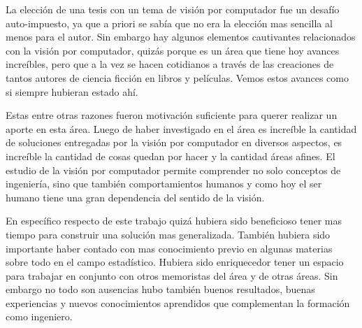 La elección de una tesis con un tema de visión por computador fue un desafío auto-impuesto, ya que a priori se sabía que no era la elección mas sencilla al menos para el autor. Sin embargo hay algunos elementos cautivantes relacionados con la visión por computador, quizás porque es un área que tiene hoy avances increíbles, pero que a la vez se hacen cotidianos a través de las creaciones de tantos autores de ciencia ficción en libros y películas. Vemos estos avances como si siempre hubieran estado ahí. 

Estas entre otras razones fueron motivación suficiente para querer realizar un aporte en esta área. Luego de haber investigado en el área es increíble la cantidad de soluciones entregadas por la visión por computador en diversos aspectos, es increíble la cantidad de cosas quedan por hacer y la cantidad áreas afines. El estudio de la visión por computador permite comprender no solo conceptos de ingeniería, sino que también comportamientos humanos y como hoy el ser humano tiene una gran dependencia del sentido de la visión.

En específico respecto de este trabajo quizá hubiera sido beneficioso tener mas tiempo para construir una solución mas generalizada. También hubiera sido importante haber contado con mas conocimiento previo en algunas materias sobre todo en el campo estadístico.  Hubiera sido enriquecedor tener un espacio para trabajar en conjunto con otros memoristas del área y de otras áreas. Sin embargo no todo son ausencias hubo también buenos resultados, buenas experiencias y nuevos conocimientos aprendidos que complementan la formación como ingeniero. 

